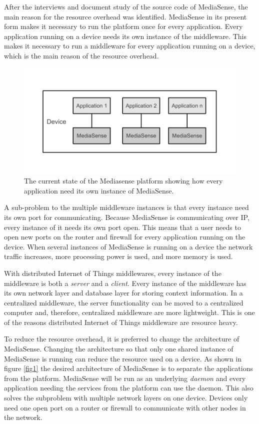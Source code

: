 After the interviews and document study of the source code of MediaSense, the main reason for the resource overhead was identified. MediaSense in its present form makes it necessary to run the platform once for every application. Every application running on a device needs its own instance of the middleware. This makes it necessary to run a middleware for every application running on a device, which is the main reason of the resource overhead. 

\begin{figure}[h!]
		\centering
    	\includegraphics[scale=0.75]{part_4/result_and_analysis/mediasense_arch_old.pdf}
		\caption{The current state of the Mediasense platform showing how every application need its own instance of MediaSense.} 
\end{figure}

A sub-problem to the multiple middleware instances is that every instance need its own port for communicating. Because MediaSense is communicating over IP, every instance of it needs its own port open. This means that a user needs to open new ports on the router and firewall for every application running on the device. When several instances of MediaSense is running on a device the network traffic increases, more processing power is used, and more memory is used. 

With distributed Internet of Things middlewares, every instance of the middleware is both a \emph{server} and a \emph{client}. Every instance of the middleware has its own network layer and database layer for storing context information. In a centralized middleware, the server functionality can be moved to a centralized computer and, therefore, centralized middleware are more lightweight. This is one of the reasons distributed Internet of Things middleware are resource heavy. 

To reduce the resource overhead, it is preferred to change the architecture of MediaSense. Changing the architecture so that only one shared instance of MediaSense is running can reduce the resource used on a device. As shown in figure \ref{fig1} the desired architecture of MediaSense is to separate the applications from the platform. MediaSense will be run as an underlying  \emph{daemon} and every application needing the services from the platform can use the daemon. This also solves the subproblem with multiple network layers on one device. Devices only need one open port on a router or firewall to communicate with other nodes in the network.  

